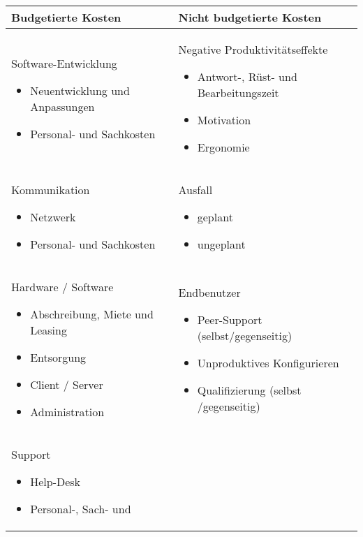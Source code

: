 \begin{table}[h!]
	\begin{tabularx}{\textwidth}{|X|X|}
		\hline \textbf{Budgetierte Kosten}  &  \textbf{Nicht budgetierte Kosten}\\
		\hline Software-Entwicklung 
			\begin{itemize}
				\item Neuentwicklung und Anpassungen
				\item Personal- und Sachkosten	
			\end{itemize}  
		& Negative Produktivitätseffekte
			\begin{itemize}
				\item Antwort-, Rüst- und Bearbeitungszeit
				\item Motivation
				\item Ergonomie
			\end{itemize} \\ 
		\hline Kommunikation \begin{itemize}
			\item Netzwerk
			\item Personal- und Sachkosten			
		\end{itemize} & Ausfall \begin{itemize}
			\item geplant
			\item ungeplant
		\end{itemize} \\ 
		\hline Hardware / Software \begin{itemize}
			\item Abschreibung, Miete und Leasing
			\item Entsorgung
			\item Client / Server
			\item Administration	
		\end{itemize} & Endbenutzer \begin{itemize}
			\item Peer-Support (selbst/gegenseitig)
			\item Unproduktives Konfigurieren
			\item Qualifizierung (selbst /gegenseitig)
		\end{itemize}  \\
		\hline Support 
			\begin{itemize}
				\item Help-Desk
				\item Personal-, Sach- und 

\end{itemize}
\end{tabularx}
\end{table}
